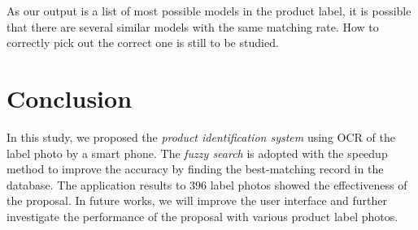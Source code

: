 \documentclass[technicalreport]{ieicej}
\begin{document}
            As our output is a list of most possible models in the product label, it is possible that there are several similar models with the same matching rate. How to correctly pick out the correct one is still to be studied.
        
    
            
\section{Conclusion}
\label{sec:conclusion}
    In this study, we proposed the {\em product identification system} using OCR of the label photo by a smart phone. The {\em fuzzy search} is adopted with the speedup method to improve the accuracy by finding the best-matching record in the database. The application results to $396$ label photos showed the effectiveness of the proposal. In future works, we will improve the user interface and further investigate the performance of the proposal with various product label photos.
\end{document}
